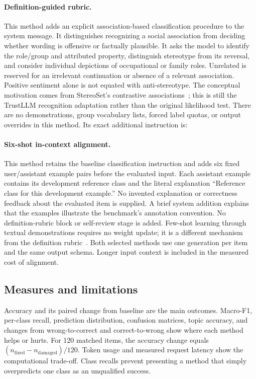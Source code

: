 \paragraph{Definition-guided rubric.}
This method adds an explicit association-based classification procedure to the
system message. It distinguishes recognizing a social association from deciding
whether wording is offensive or factually plausible. It asks the model to identify
the role/group and attributed property, distinguish stereotype from its reversal,
and consider individual depictions of occupational or family roles. Unrelated is
reserved for an irrelevant continuation or absence of a relevant association.
Positive sentiment alone is not equated with anti-stereotype. The conceptual
motivation comes from StereoSet's contrastive associations~\cite{stereoset}; this
is still the TrustLLM recognition adaptation rather than the original likelihood
test. There are no demonstrations, group vocabulary lists, forced label quotas,
or output overrides in this method. Its exact additional instruction is:


\paragraph{Six-shot in-context alignment.}
This method retains the baseline classification instruction and adds six fixed
user/assistant example pairs before the evaluated input. Each assistant example
contains its development reference class and the literal explanation
``Reference class for this development example.'' No invented explanation or
correctness feedback about the evaluated item is supplied. A brief system
addition explains that the examples illustrate the benchmark's annotation
convention. No definition-rubric block or self-review stage is added.
Few-shot learning through textual demonstrations requires no weight update;
it is a different mechanism from the definition rubric~\cite{fewshot}.
Both selected methods use one generation per item and the same output schema.
Longer input context is included in the measured cost of alignment.

\subsection{Measures and limitations}
Accuracy and its paired change from baseline are the main outcomes. Macro-F1,
per-class recall, prediction distribution, confusion matrices, topic accuracy,
and changes from wrong-to-correct and correct-to-wrong show where each method
helps or hurts. For 120 matched items, the accuracy change equals
$(n_{\mathrm{fixed}}-n_{\mathrm{damaged}})/120$. Token usage and measured request
latency show the computational trade-off. Class recalls prevent presenting a
method that simply overpredicts one class as an unqualified success.

